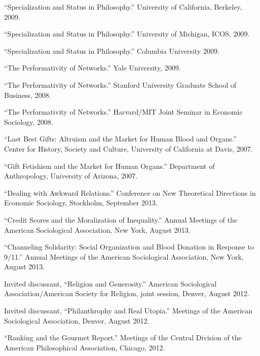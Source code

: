 \documentclass[11pt,article,oneside]{memoir}
\begin{document}
\ind ``Specialization and Status in Philosophy.'' University of California, Berkeley, 2009. 

\ind ``Specialization and Status in Philosophy.'' University of Michigan, ICOS, 2009. 

\ind ``Specialization and Status in Philosophy.'' Columbia University 2009. 

\ind ``The Performativity of Networks.'' Yale University, 2009. 

\ind ``The Performativity of Networks.'' Stanford University Graduate School of Business, 2008. 

\ind ``The Performativity of Networks.'' Harvard/MIT Joint Seminar in Economic Sociology, 2008. 

\ind ``Last Best Gifts: Altruism and the Market for Human Blood and Organs.'' Center for History, Society and Culture, University of California at Davis, 2007. 

\ind ``Gift Fetishism and the Market for Human Organs.'' Department of Anthropology, University of Arizona, 2007. 


\bigskip


\medskip

\ind ``Dealing with Awkward Relations.'' Conference on New Theoretical Directions in Economic Sociology, Stockholm, September 2013. 

\ind ``Credit Scores and the Moralization of Inequality.'' Annual Meetings of the American Sociological Association, New York, August 2013.
 
\ind ``Channeling Solidarity: Social Organization and Blood Donation in Response to 9/11.'' Annual Meetings of the American Sociological Association, New York, August 2013.

\ind Invited discussant, ``Religion and Generosity.'' American Sociological Association/American Society for Religion, joint session, Denver, August 2012.

\ind Invited discussant, ``Philanthrophy and Real Utopia.'' Meetings of the American Sociological Association, Denver, August 2012. 

\ind ``Ranking and the Gourmet Report.'' Meetings of the Central Division of the American Philosophical Association, Chicago, 2012. 
\end{document}
